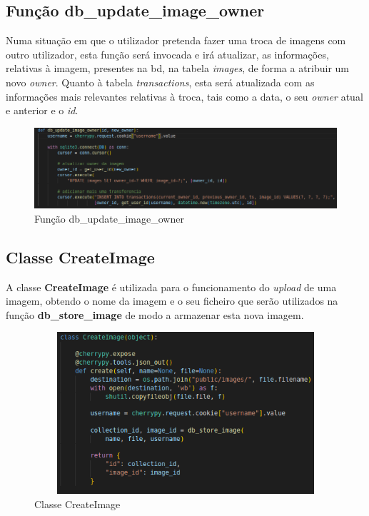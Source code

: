 \documentclass{report}
\begin{document}
\subsection{Função db\_update\_image\_owner}
\label{ssec.funcaodbupdateimageowner}

Numa situação em que o utilizador pretenda fazer uma troca de imagens com outro utilizador, esta função será invocada e irá atualizar, as informações, relativas à imagem, presentes na \ac{bd}, na tabela \textit{images}, de forma a atribuir um novo \textit{owner}. Quanto à tabela \textit{transactions}, esta será atualizada com as informações mais relevantes relativas à troca, tais como a data, o seu \textit{owner} atual e anterior e o \textit{id}.

\begin{figure}[H]
	\centering
	\includegraphics[height=3cm, width=12cm]{images/updateimageowner.png}
	\caption{Função db\_update\_image\_owner}
	\label{fig.funcaodbupdateimageowner}
\end{figure} 

\subsection{Classe CreateImage}
\label{ssec.classecreateimage}

A classe \textbf{CreateImage} é utilizada para o funcionamento do \textit{upload} de uma imagem, obtendo o nome da imagem e o seu ficheiro que serão utilizados na função \textbf{db\_store\_image} de modo a armazenar esta nova imagem.

\begin{figure}[H]
	\centering
	\includegraphics[height=6cm, width=12cm]{images/classecreateimage.png}
	\caption{Classe CreateImage}
	\label{fig.classecreateimage}
\end{figure} 
\end{document}
